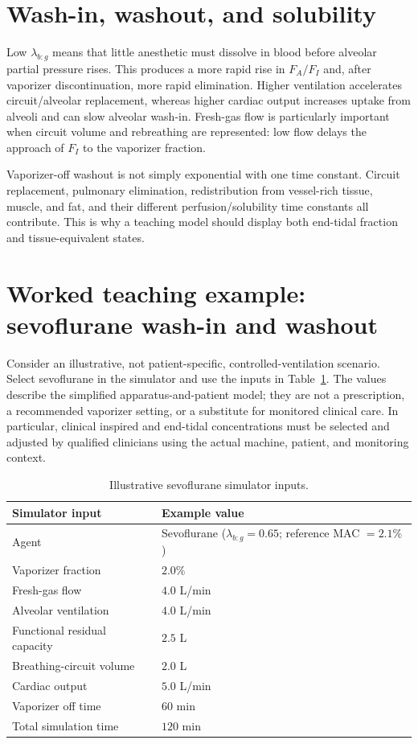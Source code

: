 \documentclass[11pt]{article}
\begin{document}
\section{Wash-in, washout, and solubility}
Low $\lambda_{b:g}$ means that little anesthetic must dissolve in blood before alveolar partial pressure rises. This produces a more rapid rise in $F_A/F_I$ and, after vaporizer discontinuation, more rapid elimination. Higher ventilation accelerates circuit/alveolar replacement, whereas higher cardiac output increases uptake from alveoli and can slow alveolar wash-in. Fresh-gas flow is particularly important when circuit volume and rebreathing are represented: low flow delays the approach of $F_I$ to the vaporizer fraction.

Vaporizer-off washout is not simply exponential with one time constant. Circuit replacement, pulmonary elimination, redistribution from vessel-rich tissue, muscle, and fat, and their different perfusion/solubility time constants all contribute. This is why a teaching model should display both end-tidal fraction and tissue-equivalent states.

\section{Worked teaching example: sevoflurane wash-in and washout}
Consider an illustrative, not patient-specific, controlled-ventilation scenario.  Select sevoflurane in the simulator and use the inputs in Table~\ref{tab:sevoexample}.  The values describe the simplified apparatus-and-patient model; they are not a prescription, a recommended vaporizer setting, or a substitute for monitored clinical care.  In particular, clinical inspired and end-tidal concentrations must be selected and adjusted by qualified clinicians using the actual machine, patient, and monitoring context.

\begin{table}[h]
\centering
\caption{Illustrative sevoflurane simulator inputs.}
\label{tab:sevoexample}
\begin{tabular}{@{}ll@{}}
\toprule
Simulator input & Example value \\
\midrule
Agent & Sevoflurane ($\lambda_{b:g}=0.65$; reference MAC $=2.1\%$) \\
Vaporizer fraction & $2.0\%$ \\
Fresh-gas flow & $4.0$ L/min \\
Alveolar ventilation & $4.0$ L/min \\
Functional residual capacity & $2.5$ L \\
Breathing-circuit volume & $2.0$ L \\
Cardiac output & $5.0$ L/min \\
Vaporizer off time & $60$ min \\
Total simulation time & $120$ min \\
\bottomrule
\end{tabular}
\end{table}
\end{document}
